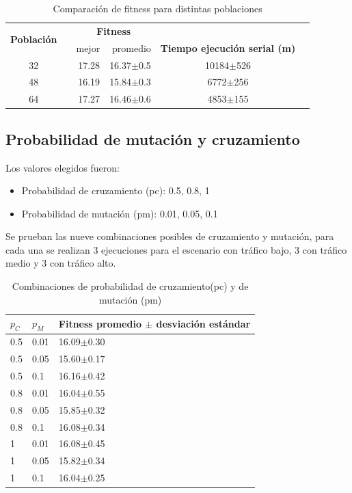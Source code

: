 \begin{table}[h]
	\renewcommand{\arraystretch}{1.2}
	\caption{Comparación de fitness para distintas poblaciones}
	\label{table:parametro_poblacion}
	\centering
	\begin{tabular}{ccrrcp{2cm}}
		\hline
	    \multirow{2}{*}{\textbf{Población}}& & 
		\multicolumn{2}{c}{\textbf{Fitness}} \\
		\cline{3-4}
		& & {mejor} 
		& {promedio} 
		& \textbf{Tiempo ejecución serial (m)} \\
		\hline
		32 & & {17.28} & 16.37$\pm$0.5 & 10184$\pm$526\\
		48 & & {16.19} & 15.84$\pm$0.3 & 6772$\pm$256\\
		64 & & {17.27} & 16.46$\pm$0.6 & 4853$\pm$155\\
		\hline
	\end{tabular}
\end{table}





\subsection{Probabilidad de mutación y cruzamiento}

Los valores elegidos fueron:

\begin{itemize}
	\item Probabilidad de cruzamiento (pc):  0.5, 0.8, 1
	\item Probabilidad de  mutación (pm):  0.01, 0.05, 0.1
\end{itemize}

Se prueban las nueve combinaciones posibles de cruzamiento y mutación, para cada una se realizan 3 ejecuciones para el escenario con tráfico bajo, 3 con tráfico medio y 3 con tráfico alto.


 
 \begin{table}[h]
 	\renewcommand{\arraystretch}{1.2}
 	\caption{Combinaciones de probabilidad de cruzamiento(pc) y de mutación (pm)}
 	\label{table:parametro_mutacion_cruzamiento}
 	\centering
 	\begin{tabular}{p{1cm}p{1cm}p{3.5cm} }
 		\hline
 		$p_C$& 
 		$p_M$ & 
 		Fitness promedio  $\pm$ desviación estándar\\ 
 		\hline
 		0.5 & 0.01  &  16.09$\pm$0.30\\
 		0.5 & 0.05 &  15.60$\pm$0.17\\
 		0.5 & 0.1  &  16.16$\pm$0.42\\
 		0.8 & 0.01  &  16.04$\pm$0.55\\
 		0.8 & 0.05  &  15.85$\pm$0.32\\
 		0.8 & 0.1  &  16.08$\pm$0.34\\
 		1 & 0.01 &  16.08$\pm$0.45\\
 		1 & 0.05 &  15.82$\pm$0.34\\
 		1 & 0.1 &  16.04$\pm$0.25\\
 		\hline
 	\end{tabular}
 \end{table}
 
